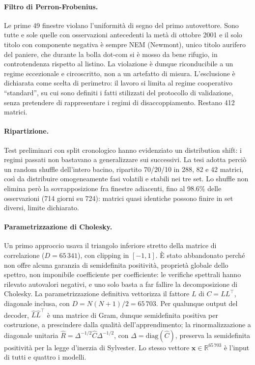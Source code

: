 \paragraph{Filtro di Perron-Frobenius.} Le prime 49 finestre violano l'uniformità di segno del primo autovettore. Sono tutte e sole quelle con osservazioni antecedenti la metà di ottobre 2001 e il solo titolo con componente negativa è sempre NEM (Newmont), unico titolo aurifero del paniere, che durante la bolla dot-com si è mosso da bene rifugio, in controtendenza rispetto al listino. La violazione è dunque riconducibile a un regime eccezionale e circoscritto, non a un artefatto di misura. L'esclusione è dichiarata come scelta di perimetro: il lavoro si limita al regime cooperativo ``standard'', su cui sono definiti i fatti stilizzati del protocollo di validazione, senza pretendere di rappresentare i regimi di disaccoppiamento. Restano 412 matrici.

\paragraph{Ripartizione.} Test preliminari con split cronologico hanno evidenziato un distribution shift: i regimi passati non bastavano a generalizzare sui successivi. La tesi adotta perciò un random shuffle dell'intero bacino, ripartito 70/20/10 in 288, 82 e 42 matrici, così da distribuire omogeneamente fasi volatili e stabili nei tre set. Lo shuffle non elimina però la sovrapposizione fra finestre adiacenti, fino al 98.6\% delle osservazioni (714 giorni su 724): matrici quasi identiche possono finire in set diversi, limite dichiarato.

\paragraph{Parametrizzazione di Cholesky.} Un primo approccio usava il triangolo inferiore stretto della matrice di correlazione ($D = 65\,341$), con clipping in $[-1, 1]$. È stato abbandonato perché non offre alcuna garanzia di semidefinita positività, proprietà globale dello spettro, non imponibile coefficiente per coefficiente: le verifiche spettrali hanno rilevato autovalori negativi, e uno solo basta a far fallire la decomposizione di Cholesky. La parametrizzazione definitiva vettorizza il fattore $L$ di $C = L L^{\top}$, diagonale inclusa, con $D = N(N+1)/2 = 65\,703$. Per qualunque output del decoder, $\hat{L}\hat{L}^{\top}$ è una matrice di Gram, dunque semidefinita positiva per costruzione, a prescindere dalla qualità dell'apprendimento; la rinormalizzazione a diagonale unitaria $\hat{R} = \Delta^{-1/2}\hat{C}\Delta^{-1/2}$, con $\Delta = \mathrm{diag}(\hat{C})$, preserva la semidefinita positività per la legge d'inerzia di Sylvester. Lo stesso vettore $\mathbf{x} \in \mathbb{R}^{65\,703}$ è l'input di tutti e quattro i modelli.

